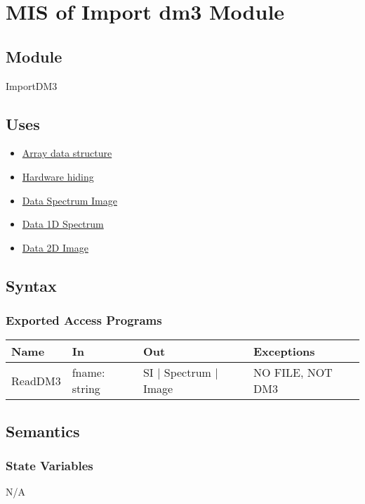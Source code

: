 \documentclass[12pt, titlepage]{article}
\begin{document}
\section{MIS of Import dm3 Module} \label{Mod:ImportDM3}

\subsection{Module}

ImportDM3

\subsection{Uses}
\begin{itemize}
	\item \hyperref[Mod:Array]{Array data structure}
	\item \hyperref[Mod:HH]{Hardware hiding}
	\item \hyperref[Mod:SI]{Data Spectrum Image}
    \item \hyperref[Mod:Spectrum]{Data 1D Spectrum}
    \item \hyperref[Mod:Image]{Data 2D Image}
\end{itemize}

\subsection{Syntax}

\subsubsection{Exported Access Programs}

\begin{center}
\begin{tabular}{p{2cm} p{4cm} p{4cm} p{4cm}}
\hline
\textbf{Name} & \textbf{In} & \textbf{Out} & \textbf{Exceptions} \\
\hline
ReadDM3 & fname: string & SI $|$ Spectrum $|$ Image & NO FILE, NOT DM3 \\
\hline
\end{tabular}
\end{center}

\subsection{Semantics}

\subsubsection{State Variables}
N/A
\end{document}
